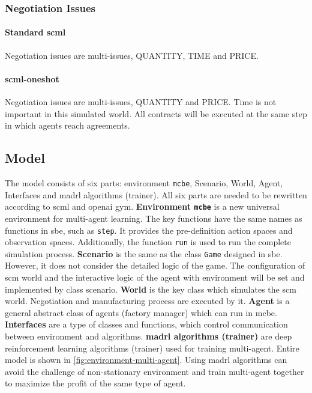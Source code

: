 \subsubsection{Negotiation Issues}
\paragraph{Standard \gls{scml}} Negotiation issues are multi-issues, QUANTITY, TIME and PRICE. 
\paragraph{\gls{scml-oneshot}} Negotiation issues are multi-issues, QUANTITY and PRICE. Time is not important in this simulated world. All contracts will be executed at the same step in which agents reach agreements.

\subsection{Model}
The model consists of six parts: environment \texttt{\gls{mcbe}}, Scenario, World, Agent, Interfaces and \gls{madrl} algorithms (trainer).
All six parts are needed to be rewritten according to \gls{scml} and \gls{openai gym}. 
\textbf{Environment \texttt{\gls{mcbe}}} is a new universal environment for multi-agent learning. The key functions have the same names as functions in \gls{sbe}, such as \texttt{step}. It provides the pre-definition action spaces and observation spaces.  Additionally, the function \texttt{run} is used to run the complete simulation process. 
\textbf{Scenario} is the same as the class \texttt{Game} designed in \gls{sbe}. However, it does not consider the detailed logic of the game. The configuration of \gls{scm} world and the interactive logic of the agent with environment will be set and implemented by class scenario.
\textbf{World} is the key class which simulates the \gls{scm} world. Negotiation and manufacturing process are executed by it.
\textbf{Agent} is a general abstract class of agents (factory manager) which can run in \gls{mcbe}. 
\textbf{Interfaces} are a type of classes and functions, which control communication between environment and algorithms.
\textbf{\gls{madrl} algorithms (trainer)} are deep reinforcement learning algorithms (trainer) used for training multi-agent.
Entire model is shown in \ref{fig:environment-multi-agent}. Using \gls{madrl} algorithms can avoid the challenge of non-stationary environment and train multi-agent together to maximize the profit of the same type of agent.

